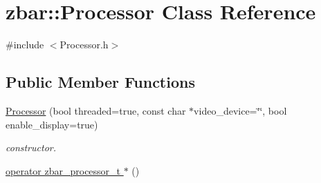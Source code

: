 \hypertarget{classzbar_1_1_processor}{
\section{zbar::Processor Class Reference}
\label{classzbar_1_1_processor}
}


{\ttfamily \#include $<$Processor.h$>$}

\subsection*{Public Member Functions}
\begin{DoxyCompactItemize}
\item 
\hypertarget{classzbar_1_1_processor_a28c24540a9890bd0bef30e0315a7be40}{
\hyperlink{classzbar_1_1_processor_a28c24540a9890bd0bef30e0315a7be40}{Processor} (bool threaded=true, const char $\ast$video\_\-device=\char`\"{}\char`\"{}, bool enable\_\-display=true)}
\label{classzbar_1_1_processor_a28c24540a9890bd0bef30e0315a7be40}

\begin{DoxyCompactList}\small\item\em constructor. \end{DoxyCompactList}\item 
\hypertarget{classzbar_1_1_processor_a3f3316522610f08c9fdfa90004bf345e}{
\hyperlink{classzbar_1_1_processor_a3f3316522610f08c9fdfa90004bf345e}{operator zbar\_\-processor\_\-t $\ast$} ()}
\label{classzbar_1_1_processor_a3f3316522610f08c9fdfa90004bf345e}


\end{DoxyCompactItemize}

